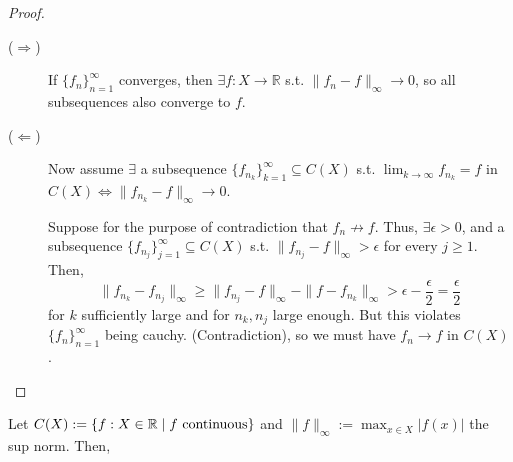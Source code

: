 \begin{proof} \leavevmode
\begin{description}
    \item[($\Rightarrow$)] 
    If $\{f_{n}\}_{n=1}^{\infty} $ converges, then $\exists f : X \to \mathbb{R}$ s.t. 
    $\| f_n - f \|_{\infty} \to 0$, so all subsequences also converge to $f$.
    
    \item[($\Leftarrow$)] 
    Now assume $\exists$ a subsequence $\{f_{n_k}\}_{k=1}^{\infty} \subseteq C(X)$ s.t. 
    $\lim_{k \to \infty} f_{n_k} = f$ in $C(X) \iff \| f_{n_k} - f \|_{\infty} \to 0$.
    
    Suppose for the purpose of contradiction that $f_n \not\to f$. Thus, $\exists \epsilon > 0$, 
    and a subsequence $\{f_{n_j}\}_{j=1}^{\infty} \subseteq C(X)$ s.t. $\| f_{n_j} -f  \|_{\infty} 
    > \epsilon$ for every $j \geq 1$. Then, 
    \[ 
    \| f_{n_k} - f_{n_j} \|_{\infty} \geq  \| f_{n_j} - f \|_{\infty} -\| f - f_{n_k} 
    \|_{\infty} > \epsilon - \frac{\epsilon}{2} = \frac{\epsilon}{2}
    \] 
    for $k$ sufficiently large and for $n_k, n_j$ large enough. But this violates 
    $\{f_{n}\}_{n=1}^{\infty} $ being cauchy. (Contradiction), so we must have $f_n \to f$ 
    in $C(X)$. \qedhere
\end{description}
\end{proof}

\noindent Let $C(X) := \left\{ f : X \in \mathbb{R} \mid f \text{ continuous} \right\} $ and 
$\| f \|_{\infty} := \max_{x \in X} \left| f(x) \right| $ the sup norm. Then,  

